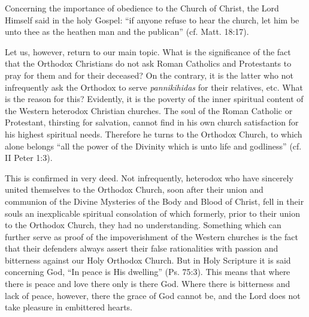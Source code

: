 Concerning the importance of obedience to the Church of Christ, the Lord Himself said in the holy Gospel: ``if anyone refuse to hear the church, let him be unto thee as the heathen man and the publican'' (cf. Matt. 18:17).

Let us, however, return to our main topic. What is the significance of the fact that the Orthodox Christians do not ask Roman Catholics and Protestants to pray for them and for their deceased? On the contrary, it is the latter who not infrequently ask the Orthodox to serve \textit{pannikihidas} for their relatives, etc. What is the reason for this? Evidently, it is the poverty of the inner spiritual content of the Western heterodox Christian churches. The soul of the Roman Catholic or Protestant, thirsting for salvation, cannot find in his own church satisfaction for his highest spiritual needs. Therefore he turns to the Orthodox Church, to which alone belongs ``all the power of the Divinity which is unto life and godliness'' (cf. II Peter 1:3).

This is confirmed in very deed. Not infrequently, heterodox who have sincerely united themselves to the Orthodox Church, soon after their union and communion of the Divine Mysteries of the Body and Blood of Christ, fell in their souls an inexplicable spiritual consolation of which formerly, prior to their union to the Orthodox Church, they had no understanding. Something which can further serve as proof of the impoverishment of the Western churches is the fact that their defenders always assert their false rationalities with passion and bitterness against our Holy Orthodox Church. But in Holy Scripture it is said concerning God, ``In peace is His dwelling'' (Ps. 75:3). This means that where there is peace and love there only is there God. Where there is bitterness and lack of peace, however, there the grace of God cannot be, and the Lord does not take pleasure in embittered hearts.

